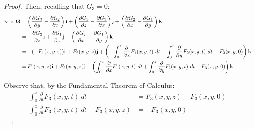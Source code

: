 \begin{proof}
    Then, recalling that \(G_3 = 0\):
    \begin{align*}
        \nabla \times \vb{G} &= \left(\frac{\partial G_3}{\partial y} - \frac{\partial G_2}{\partial z}\right) \vb{i} + \left(\frac{\partial G_1}{\partial z} - \frac{\partial G_3}{\partial x}\right) \vb{j} + \left(\frac{\partial G_2}{\partial x} - \frac{\partial G_1}{\partial y}\right) \vb{k} \\
        &= - \frac{\partial G_2}{\partial z} \vb{i} + \frac{\partial G_1}{\partial z}\vb{j} + \left(\frac{\partial G_2}{\partial x} - \frac{\partial G_1}{\partial y}\right) \vb{k} \\
        &= - (- F_1(x, y, z)) \vb{i} + F_2(x, y, z) \vb{j} + \left(- \int_0^z \frac{\partial}{\partial x} F_1(x, y, t) \ dt - \int_0^z \frac{\partial}{\partial y} F_2(x, y, t) \ dt + F_3(x, y, 0)\right) \vb{k} \\
        &= F_1(x, y, z) \vb{i} + F_2(x, y, z) \vb{j} - \left(\int_0^z \frac{\partial}{\partial x} F_1(x, y, t) \ dt + \int_0^z \frac{\partial}{\partial y} F_2(x, y, t) \ dt - F_3(x, y, 0)\right) \vb{k}
    \end{align*}
    
    Observe that, by the Fundamental Theorem of Calculus:
    \begin{align*}
        \int_0^z \frac{\partial }{\partial t} F_3(x, y, t) \ dt &= F_3(x, y, z) - F_3(x, y, 0) \\
        \int_0^z \frac{\partial }{\partial t} F_3(x, y, t) \ dt - F_3(x, y, z) &= - F_3(x, y, 0)
    \end{align*}
    

\end{proof}
